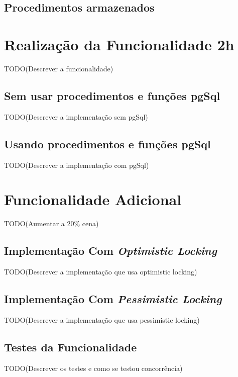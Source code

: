 %
%
\subsection{Procedimentos armazenados}\label{sec312}

%
%
\section{Realização da Funcionalidade 2h} \label{sec32}

TODO(Descrever a funcionalidade)

%
%
\subsection{Sem usar procedimentos e funções pgSql} \label{sec321}

TODO(Descrever a implementação sem pgSql)

%
%
\subsection{Usando procedimentos e funções pgSql} \label{sec322}

TODO(Descrever a implementação com pgSql)

%
%
\section{Funcionalidade Adicional} \label{sec33}

TODO(Aumentar a 20\% cena)

%
%
\subsection{Implementação Com \textit{Optimistic Locking}} \label{sec331}

TODO(Descrever a implementação que usa optimistic locking)

%
%
\subsection{Implementação Com \textit{Pessimistic Locking}} \label{sec332}

TODO(Descrever a implementação que usa pessimistic locking)

%
%
\subsection{Testes da Funcionalidade}\label{sec333}

TODO(Descrever os testes e como se testou concorrência)